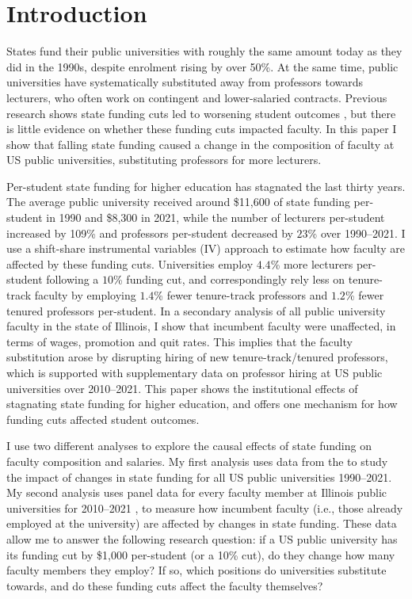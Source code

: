 \section{Introduction}
\label{sec:intro}
States fund their public universities with roughly the same amount today as they did in the 1990s, despite enrolment rising by over 50\%.
At the same time, public universities have systematically substituted away from professors towards lecturers, who often work on contingent and lower-salaried contracts.
Previous research shows state funding cuts led to worsening student outcomes \citep{NBERw23736,NBERw27885}, but there is little evidence on whether these funding cuts impacted faculty.
In this paper I show that falling state funding caused a change in the composition of faculty at US public universities, substituting professors for more lecturers.

Per-student state funding for higher education has stagnated the last thirty years.
The average public university received around \$11,600 of state funding per-student in 1990 and \$8,300 in 2021, while the number of lecturers per-student increased by 109\% and professors per-student decreased by $23$\% over 1990--2021.
I use a shift-share instrumental variables (IV) approach to estimate how faculty are affected by these funding cuts.
Universities employ $4.4$\% more lecturers per-student following a $10$\% funding cut, and correspondingly rely less on tenure-track faculty by employing $1.4$\% fewer tenure-track professors and $1.2$\% fewer tenured professors per-student.
In a secondary analysis of all public university faculty in the state of Illinois, I show that incumbent faculty were unaffected, in terms of wages, promotion and quit rates.
This implies that the faculty substitution arose by disrupting hiring of new tenure-track/tenured professors, which is supported with supplementary data on professor hiring at US public universities over 2010--2021.
This paper shows the institutional effects of stagnating state funding for higher education, and offers one mechanism for how funding cuts affected student outcomes.

I use two different analyses to explore the causal effects of state funding on faculty composition and salaries.
My first analysis uses data from the \citet[IPEDS]{ipeds} to study the impact of changes in state funding for all US public universities 1990--2021.
My second analysis uses panel data for every faculty member at Illinois public universities for 2010--2021 \citet[IBHED]{ibhed}, to measure how incumbent faculty (i.e., those already employed at the university) are affected by changes in state funding.
These data allow me to answer the following research question: if a US public university has its funding cut by \$1,000 per-student (or a 10\% cut), do they change how many faculty members they employ?
If so, which positions do universities substitute towards, and do these funding cuts affect the faculty themselves?


